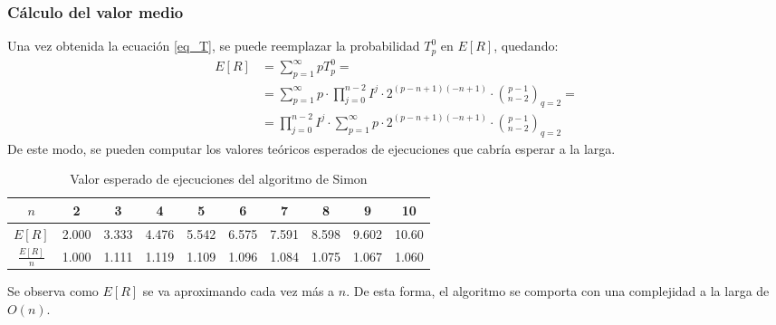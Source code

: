 \subsubsection{Cálculo del valor medio}
Una vez obtenida la ecuación \eqref{eq_T}, se puede reemplazar la probabilidad 
$T_p^0$ en $E[R]$, quedando:
%
\begin{equation}
\begin{split}
	E[R] &= \sum_{p=1}^\infty p T^0_p =\\
	&= \sum_{p=1}^\infty p \cdot \prod^{n-2}_{j=0} I^j \cdot 2^{(p-n+1)(-n+1)} 
\cdot {p-1 \choose n-2}_{q=2} = \\
	&= \prod^{n-2}_{j=0} I^j \cdot \sum_{p=1}^\infty p \cdot 2^{(p-n+1)(-n+1)} 
\cdot {p-1 \choose n-2}_{q=2}
\end{split}
\end{equation}
%
De este modo, se pueden computar los valores teóricos esperados de ejecuciones 
que cabría esperar a la larga.
\begin{table}[h]
	\centering
	\begin{tabular}{|c|*{9}{|c}|}
		\hline
		$n$      & 2 & 3 & 4 & 5 & 6 & 7 & 8 & 9 & 10\\ \hline
		$E[R]$   &
2.000& 3.333& 4.476& 5.542& 6.575& 7.591& 8.598& 9.602& 10.60
\\
		$\frac{E[R]}{n}$ &
1.000& 1.111& 1.119& 1.109& 1.096& 1.084& 1.075& 1.067& 1.060\\
		\hline
	\end{tabular}
\caption{Valor esperado de ejecuciones del algoritmo de Simon}
\label{tabla_E}
\end{table}
%

Se observa como $E[R]$ se va aproximando cada vez más a $n$. De esta forma, el 
algoritmo se comporta con una complejidad a la larga de $O(n)$.
